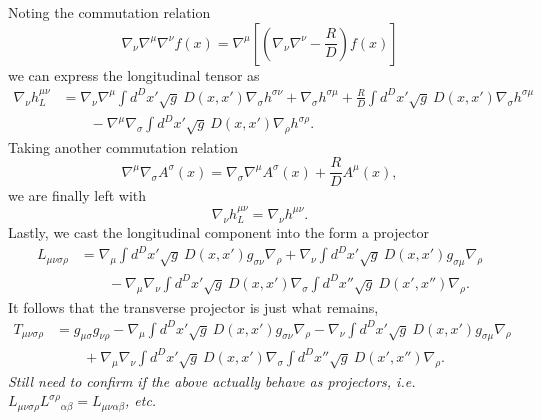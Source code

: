 \documentclass[10pt,letterpaper]{article}
\numberwithin{equation}{subsection}
\begin{document}
Noting the commutation relation
\begin{equation}
\nabla_\nu \nabla^\mu \nabla^\nu f(x) = \nabla^\mu\left[\left( \nabla_\nu \nabla^\nu - \frac{R}{D}\right)f(x)\right]
\end{equation}
we can express the longitudinal tensor as
\begin{align}
\nabla_\nu h^{\mu\nu}_L &= \nabla_\nu \nabla^\mu \int d^Dx' \sqrt{g}\ D(x,x')\nabla_\sigma h^{\sigma\nu}
+ \nabla_\sigma h^{\sigma\mu} + \frac{R}{D}  \int d^Dx' \sqrt{g}\  D(x,x')\nabla_\sigma h^{\sigma\mu} 
\nonumber
\\ &\qquad 
- \nabla^\mu \nabla_\sigma \int d^Dx' \sqrt{g}\ D(x,x')\nabla_\rho h^{\sigma\rho}.
\end{align}
Taking another commutation relation
\begin{equation}
\nabla^\mu \nabla_\sigma A^\sigma(x) = \nabla_\sigma\nabla^\mu A^\sigma(x) + \frac{R}{D}A^\mu(x),
\end{equation}
we are finally left with
\begin{equation}
\nabla_\nu h^{\mu\nu}_L = \nabla_\nu h^{\mu\nu}.
\end{equation}
Lastly, we cast the longitudinal component into the form a projector
\begin{align}
L_{\mu\nu\sigma\rho} &= \nabla_\mu \int d^Dx' \sqrt g\ D(x,x') g_{\sigma\nu}\nabla_\rho 
+ \nabla_\nu \int d^Dx' \sqrt g\ D(x,x') g_{\sigma\mu}\nabla_\rho 
\nonumber\\
&\qquad - \nabla_\mu\nabla_\nu \int d^Dx'\sqrt{g}\  D(x,x') \nabla_\sigma \int d^Dx'' \sqrt{g}\ D(x',x'')\nabla_\rho. 
\end{align}
It follows that the transverse projector is just what remains,
\begin{align}
T_{\mu\nu\sigma\rho} &= g_{\mu\sigma}g_{\nu\rho}- \nabla_\mu \int d^Dx' \sqrt g\ D(x,x') g_{\sigma\nu}\nabla_\rho 
- \nabla_\nu \int d^Dx' \sqrt g\ D(x,x') g_{\sigma\mu}\nabla_\rho 
\nonumber\\
&\qquad + \nabla_\mu\nabla_\nu \int d^Dx'\sqrt{g}\  D(x,x') \nabla_\sigma \int d^Dx'' \sqrt{g}\ D(x',x'')\nabla_\rho. 
\end{align}
\emph{Still need to confirm if the above actually behave as projectors, i.e. $L_{\mu\nu\sigma\rho}L^{\sigma\rho}{}_{\alpha\beta} = L_{\mu\nu\alpha\beta}$, etc.}
\end{document}
